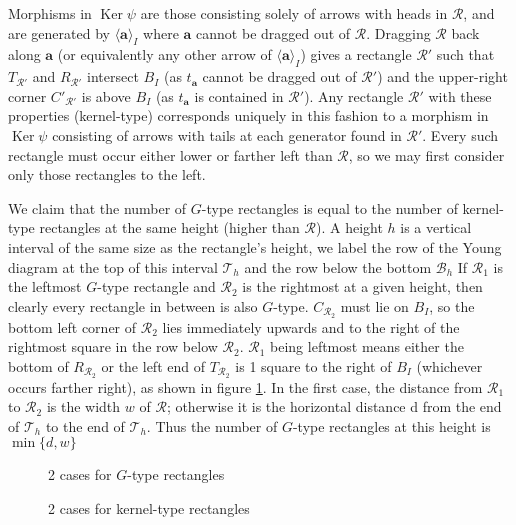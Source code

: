\documentclass[a4page]{article}
\def\Ker{\operatorname{Ker}}
\theoremstyle{definition}
\newcommand{\R}{\mathcal{R}}
\begin{document}
Morphisms in $\Ker \psi$ are those consisting solely of arrows with heads in $\R$, and are generated by $\langle \mathbf a \rangle_I$ where $\mathbf a$ cannot be dragged out of $\R$.
Dragging $\R$ back along $\mathbf a$ (or equivalently any other arrow of $\langle \mathbf a \rangle_I$) gives a rectangle $\R'$
such that $T_{\R'}$ and $R_{\R'}$ intersect $B_I$ (as $t_{\mathbf a}$ cannot be dragged out of $\R'$) and the upper-right corner $C'_{\R'}$ is above $B_I$ (as $t_{\mathbf a}$ is contained in $\R'$).
Any rectangle $\R'$ with these properties (kernel-type) corresponds uniquely in this fashion to a morphism in $\Ker \psi$ consisting of arrows with tails at each generator found in $\R'$.
Every such rectangle must occur either lower or farther left than $\R$, so we may first consider only those rectangles to the left.

We claim that the number of $G$-type rectangles is equal to the number of kernel-type rectangles at the same height (higher than $\R$).
A height $h$ is a vertical interval of the same size as the rectangle's height, we label the row of the Young diagram at the top of this interval $\mathcal{T}_h$ and the row below the bottom $\mathcal{B}_h$
If $\R_1$ is the leftmost $G$-type rectangle and $\R_2$ is the rightmost at a given height, then clearly every rectangle in between is also $G$-type.
$C_{\R_2}$ must lie on $B_I$, so the bottom left corner of $\R_2$ lies immediately upwards and to the right of the rightmost square in the row below $\R_2$.
$\R_1$ being leftmost means either the bottom of $R_{\R_2}$ or the left end of $T_{\R_2}$ is 1 square to the right of $B_I$ (whichever occurs farther right), as shown in figure \ref{fig:cokt}.
In the first case, the distance from $\R_1$ to $\R_2$ is the width $w$ of $\R$; otherwise it is the horizontal distance d from the end of $\mathcal{T}_h$ to the end of $\mathcal{T}_h$.
Thus the number of $G$-type rectangles at this height is $\min \{d,w\}$

\begin{figure}%
    \centering
    \qquad
    \caption{2 cases for $G$-type rectangles}%
    \label{fig:cokt}%
\end{figure}

\begin{figure}%
    \centering
    \qquad
    \caption{2 cases for kernel-type rectangles}%
    \label{fig:kert}%
\end{figure}
\end{document}
